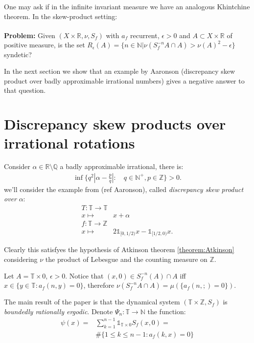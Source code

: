 \documentclass{article}
\begin{document}
One may ask if in the infinite invariant measure we have an
analogous Khintchine theorem. In the skew-product
setting:
\paragraph{}
\textbf{Problem:} Given $(X\times \mathbb{R}, \nu,S_f)$ with $a_f$
recurrent, $\epsilon>0$ and $A\subset X\times \mathbb{R}$ of positive
measure, is the set $R_\epsilon(A)=\{n\in \mathbb{N}|\nu(S_f^{-n}
A\cap A)>\nu(A)^2-\epsilon\}$ syndetic?

In the next section we show that an example by Aaronson (discrepancy 
skew product over badly approximable irrational numbers) gives a negative
answer to that question. 


\section{Discrepancy skew products over irrational rotations}


Consider $\alpha\in \mathbb{R}\setminus \mathbb{Q}$
a badly approximable irrational, there is:
\begin{align*}
    \inf\{q^2|\alpha-\frac{p}{q}| :\quad q\in\mathbb{N}^+, p\in \mathbb{Z}\}>0.
\end{align*}
we'll consider the example from  (ref Aaronson), called \textit{discrepancy
skew product over} $\alpha$:
\begin{align*}
T:\mathbb{T}\to \mathbb{T}&\\
 x\mapsto & x+\alpha \\
f:\mathbb{T}\to \mathbb{Z}&\\
x\mapsto & 2\mathds{1}_{[0,1/2)}x-\mathds{1}_{[1/2,0)}x.
\end{align*}

Clearly this satisfyes the hypothesis of Atkinson theorem \ref{theorem:Atkinson}
considering $\nu$ the product of Lebesgue and the counting measure on $\mathbb{Z}$.

Let $A=\mathbb{T}\times {0}$, $\epsilon>0$. Notice that $(x,0)
\in S_f^{-n}(A)\cap A$ iff $x\in \{y\in \mathbb{T}: a_f(n,y)=0\}$, 
therefore $\nu(S_f^{-n}A\cap A)=\mu(\{a_f(n,;)=0\})$.


The main result of the paper is that the dynamical system 
$(\mathbb{T}\times \mathbb{Z},S_f)$ is \textit{boundedly rationally ergodic}.
Denote $\Psi_n: \mathbb{T}\to \mathbb{N}$ the function:
\begin{align}
    \psi(x)=&\sum_{k=1}^{n-1} \mathds{1}_{\mathbb{T}\times{0}} S_f(x,0)=\\
    & \#\{1\leq k\leq n-1: a_f(k,x)=0\}
\end{align}
\end{document}
